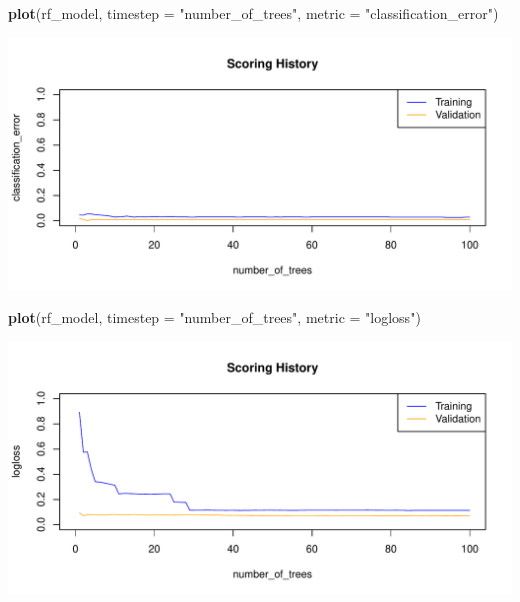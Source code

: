 \documentclass[]{article}
\newenvironment{Shaded}{\begin{snugshade}}{\end{snugshade}}
\newcommand{\KeywordTok}[1]{\textcolor[rgb]{0.13,0.29,0.53}{\textbf{{#1}}}}
\newcommand{\DataTypeTok}[1]{\textcolor[rgb]{0.13,0.29,0.53}{{#1}}}
\newcommand{\StringTok}[1]{\textcolor[rgb]{0.31,0.60,0.02}{{#1}}}
\newcommand{\NormalTok}[1]{{#1}}
\begin{document}
\begin{Shaded}
\begin{Highlighting}[]
\KeywordTok{plot}\NormalTok{(rf_model,}
     \DataTypeTok{timestep =} \StringTok{"number_of_trees"}\NormalTok{,}
     \DataTypeTok{metric =} \StringTok{"classification_error"}\NormalTok{)}
\end{Highlighting}
\end{Shaded}

\begin{center}\includegraphics{webinar_code_files/figure-latex/unnamed-chunk-53-1} \end{center}

\begin{Shaded}
\begin{Highlighting}[]
\KeywordTok{plot}\NormalTok{(rf_model,}
     \DataTypeTok{timestep =} \StringTok{"number_of_trees"}\NormalTok{,}
     \DataTypeTok{metric =} \StringTok{"logloss"}\NormalTok{)}
\end{Highlighting}
\end{Shaded}

\begin{center}\includegraphics{webinar_code_files/figure-latex/unnamed-chunk-54-1} \end{center}
\end{document}
